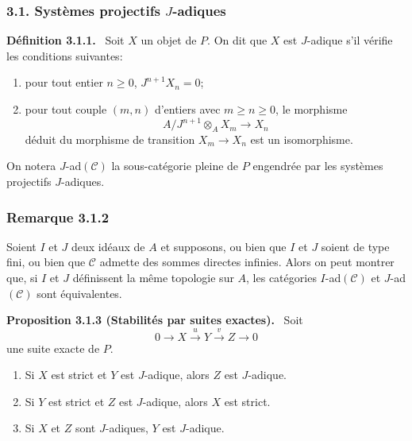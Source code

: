\documentclass[11pt]{article}
\newenvironment{statement}[1]{\par\medskip\noindent\textbf{#1.}\ }{\par\medskip}
\providecommand{\cC}{\mathcal C}
\providecommand{\cC}{\mathcal C}
\begin{document}
\subsubsection*{3.1. Systèmes projectifs $J$-adiques}
\begin{statement}{Définition 3.1.1}
Soit $X$ un objet de $P$. On dit que $X$ est $J$-adique s'il vérifie les conditions suivantes:
\begin{enumerate}[label=(\roman*)]
\item pour tout entier $n\ge0$, $J^{n+1}X_n=0$;
\item pour tout couple $(m,n)$ d'entiers avec $m\ge n\ge0$, le morphisme
\[
A/J^{n+1}\otimes_A X_m\longrightarrow X_n
\]
déduit du morphisme de transition $X_m\to X_n$ est un isomorphisme.
\end{enumerate}
\end{statement}
On notera $J$-ad$(\cC)$ la sous-catégorie pleine de $P$ engendrée par les systèmes projectifs $J$-adiques.

\subsubsection*{Remarque 3.1.2}
Soient $I$ et $J$ deux idéaux de $A$ et supposons, ou bien que $I$ et $J$ soient de type fini, ou bien que $\cC$ admette des sommes directes infinies. Alors on peut montrer que, si $I$ et $J$ définissent la même topologie sur $A$, les catégories $I$-ad$(\cC)$ et $J$-ad$(\cC)$ sont équivalentes.

\begin{statement}{Proposition 3.1.3 (Stabilités par suites exactes)}
Soit
\[
0\longrightarrow X\stackrel{u}{\longrightarrow}Y\stackrel{v}{\longrightarrow}Z\longrightarrow0
\]
une suite exacte de $P$.
\begin{enumerate}[label=(\roman*)]
\item Si $X$ est strict et $Y$ est $J$-adique, alors $Z$ est $J$-adique.
\item Si $Y$ est strict et $Z$ est $J$-adique, alors $X$ est strict.
\item Si $X$ et $Z$ sont $J$-adiques, $Y$ est $J$-adique.
\end{enumerate}
\end{statement}
\end{document}
